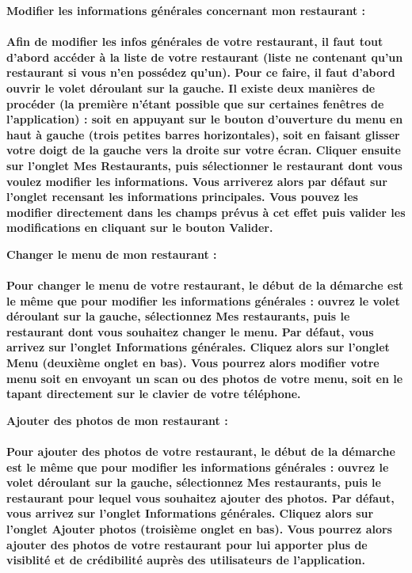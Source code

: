 \begin{description}
    \item \bf{Modifier les informations générales concernant mon restaurant :} \\ \\
    Afin de modifier les infos générales de votre restaurant, il faut tout d'abord accéder à la liste de votre restaurant (liste ne contenant qu'un restaurant si vous n'en possédez qu'un). Pour ce faire, il faut d'abord ouvrir le volet déroulant sur la gauche. Il existe deux manières de procéder (la première n'étant possible que sur certaines fenêtres de l’application) : soit en appuyant sur le bouton d'ouverture du menu en haut à gauche (trois petites barres horizontales), soit en faisant glisser votre doigt de la gauche vers la droite sur votre écran. Cliquer ensuite sur l’onglet \og{}Mes Restaurants\fg{}, puis sélectionner le restaurant dont vous voulez modifier les informations. Vous arriverez alors par défaut sur l'onglet recensant les informations principales. Vous pouvez les modifier directement dans les champs prévus à cet effet puis valider les modifications en cliquant sur le bouton \og{}Valider\fg{}. \\

    \item \bf{Changer le menu de mon restaurant :} \\ \\
    Pour changer le menu de votre restaurant, le début de la démarche est le même que pour modifier les informations générales : ouvrez le volet déroulant sur la gauche, sélectionnez \og{}Mes restaurants\fg{}, puis le restaurant dont vous souhaitez changer le menu. Par défaut, vous arrivez sur l'onglet \og{}Informations générales\fg{}. Cliquez alors sur l'onglet \og{}Menu\fg{} (deuxième onglet en bas). Vous pourrez alors modifier votre menu soit en envoyant un scan ou des photos de votre menu, soit en le tapant directement sur le clavier de votre téléphone. \\
        
    \item \bf{Ajouter des photos de mon restaurant :} \\ \\
    Pour ajouter des photos de votre restaurant, le début de la démarche est le même que pour modifier les informations générales : ouvrez le volet déroulant sur la gauche, sélectionnez \og{}Mes restaurants\fg{}, puis le restaurant pour lequel vous souhaitez ajouter des photos. Par défaut, vous arrivez sur l'onglet \og{}Informations générales\fg{}. Cliquez alors sur l’onglet \og{}Ajouter photos\fg{} (troisième onglet en bas). Vous pourrez alors ajouter des photos de votre restaurant pour lui apporter plus de visiblité et de crédibilité auprès des utilisateurs de l'application. \\


\end{description}
